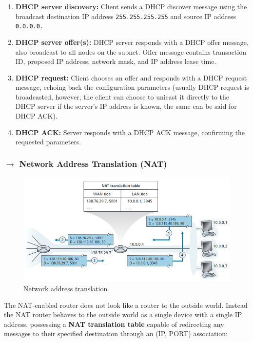 \begin{enumerate}[nolistsep]
    \item \textbf{DHCP server discovery:} Client sends a DHCP discover message using the broadcast destination IP address \texttt{255.255.255.255} and source IP address \texttt{0.0.0.0.}
    
    \item \textbf{DHCP server offer(s):} DHCP server responds with a DHCP offer message, also broadcast to all nodes on the subnet. Offer message contains transaction ID, proposed IP address, network mask, and IP address lease time.
    
    \item \textbf{DHCP request:} Client chooses an offer and responds with a DHCP request message, echoing back the configuration parameters (usually DHCP request is broadcasted, however, the client can choose to unicast it directly to the DHCP server if the server's IP address is known, the same can be said for DHCP ACK).
    
    \item \textbf{DHCP ACK:} Server responds with a DHCP ACK message, confirming the requested parameters.
\end{enumerate}

\subsubsection[4.4.4 Network Address Translation (NAT)]{$\rightarrow$ Network Address Translation (NAT)}

\begin{figure}[H]
    \centering
    \includegraphics[width = 0.9\linewidth]{img/4/data-plane/NAT.png}
    \caption{Network address translation}
    \label{fig:NAT}
\end{figure}

\noindent The NAT-enabled router does not look like a router to the outside world. Instead
the NAT router behaves to the outside world as a single device with a single IP
address, possessing a \textbf{NAT translation table} capable of redirecting any messages to their specified destination through an (IP, PORT) association:

